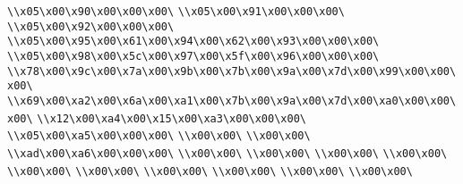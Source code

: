\verb|\\x05\x00\x90\x00\x00\x00\|\newline
\verb|\\x05\x00\x91\x00\x00\x00\|\newline
\verb|\\x05\x00\x92\x00\x00\x00\|\newline
\verb|\\x05\x00\x95\x00\x61\x00\x94\x00\x62\x00\x93\x00\x00\x00\|\newline
\verb|\\x05\x00\x98\x00\x5c\x00\x97\x00\x5f\x00\x96\x00\x00\x00\|\newline
\verb|\\x78\x00\x9c\x00\x7a\x00\x9b\x00\x7b\x00\x9a\x00\x7d\x00\x99\x00\x00\x00\|\newline
\verb|\\x69\x00\xa2\x00\x6a\x00\xa1\x00\x7b\x00\x9a\x00\x7d\x00\xa0\x00\x00\x00\|\newline
\verb|\\x12\x00\xa4\x00\x15\x00\xa3\x00\x00\x00\|\newline
\verb|\\x05\x00\xa5\x00\x00\x00\|\newline
\verb|\\x00\x00\|\newline
\verb|\\x00\x00\|\newline
\verb|\\xad\x00\xa6\x00\x00\x00\|\newline
\verb|\\x00\x00\|\newline
\verb|\\x00\x00\|\newline
\verb|\\x00\x00\|\newline
\verb|\\x00\x00\|\newline
\verb|\\x00\x00\|\newline
\verb|\\x00\x00\|\newline
\verb|\\x00\x00\|\newline
\verb|\\x00\x00\|\newline
\verb|\\x00\x00\|\newline
\verb|\\x00\x00\|\newline

